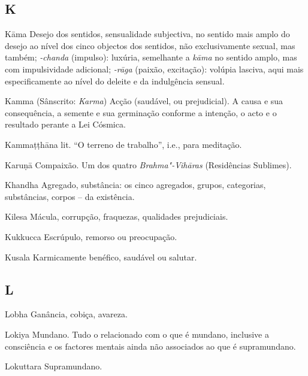 \subsection{K}

\begin{glossarydescription}

\item[Kāma] Desejo dos sentidos, sensualidade subjectiva, no sentido mais
amplo do desejo ao nível dos cinco objectos dos sentidos, não exclusivamente
sexual, mas também; \emph{-chanda} (impulso): luxúria, semelhante a
\emph{kāma} no sentido amplo, mas com impulsividade adicional; \emph{-rāga}
(paixão, excitação): volúpia lasciva, aqui mais especificamente ao nível do
deleite e da indulgência sensual.

\item[Kamma] (Sânscrito: \emph{Karma}) Acção (saudável, ou prejudicial). A causa
e sua consequência, a semente e sua germinação conforme a intenção, o acto e o
resultado perante a Lei Cósmica.

\item[Kammaṭṭhāna] lit. ``O terreno de trabalho'', i.e., para meditação.

\item[Karuṇā] Compaixão. Um dos quatro \emph{Brahma"-Vihāras} (Residências Sublimes).

\item[Khandha] Agregado, substância: os cinco agregados, grupos, categorias,
substâncias, corpos -- da existência.

\item[Kilesa] Mácula, corrupção, fraquezas, qualidades prejudiciais.

\item[Kukkucca] Escrúpulo, remorso ou preocupação.

\item[Kusala] Karmicamente benéfico, saudável ou salutar.

\end{glossarydescription}

\subsection{L}

\begin{glossarydescription}

\item[Lobha] Ganância, cobiça, avareza.

\item[Lokiya] Mundano. Tudo o relacionado com o que é mundano, inclusive a
consciência e os factores mentais ainda não associados ao que é supramundano.

\item[Lokuttara] Supramundano.

\end{glossarydescription}

